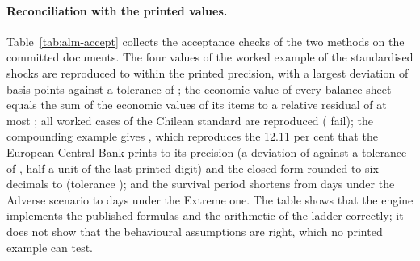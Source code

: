 \paragraph{Reconciliation with the printed values.}
Table~\ref{tab:alm-accept} collects the acceptance checks of the two methods on the committed documents. The four values of the worked example of the standardised shocks are reproduced to within the printed precision, with a largest deviation of \almSrpDevMax{} basis points against a tolerance of \almSrpTolBp{}; the economic value of every balance sheet equals the sum of the economic values of its items to a relative residual of at most \almCSumPartsC{}; all \almDAnnexCases{} worked cases of the Chilean standard are reproduced (\almDAnnexFailed{} fail); the compounding example gives \almLGoldenMetric{}, which reproduces the 12.11 per cent that the European Central Bank prints to its precision (a deviation of \almLGoldenPrintedDev{} against a tolerance of \almLGoldenPrintedTol{}, half a unit of the last printed digit) and the closed form rounded to six decimals to \almLGoldenStat{} (tolerance \almLGoldenTol{}); and the survival period shortens from \almAcceptSurvivalAdv{} days under the Adverse scenario to \almAcceptSurvivalExt{} days under the Extreme one. The table shows that the engine implements the published formulas and the arithmetic of the ladder correctly; it does not show that the behavioural assumptions are right, which no printed example can test.


